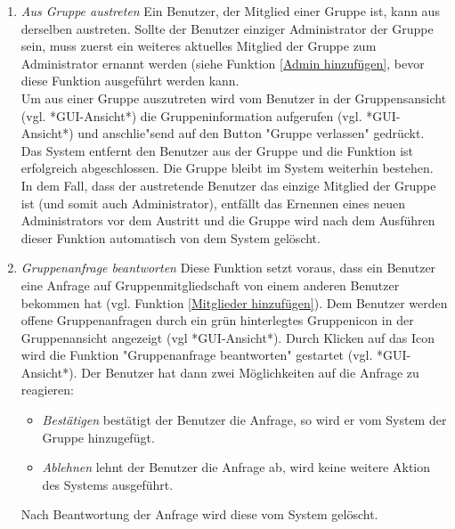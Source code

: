 \documentclass[parskip=full]{scrartcl}
\def\threedigits#1{%
  \ifnum#1<100 0\fi
  \ifnum#1<10 0\fi
  \number#1}
\begin{document}
\begin{enumerate}[label={\textbf{/F\protect\threedigits{\theenumi}0/}}, leftmargin=*, resume]
	\item \textit{Aus Gruppe austreten}
	Ein \gls{Benutzer}, der Mitglied einer Gruppe ist, kann aus derselben austreten. Sollte der Benutzer einziger Administrator der Gruppe sein, muss zuerst ein weiteres aktuelles Mitglied der Gruppe zum Administrator ernannt werden (siehe Funktion \ref{Admin hinzufügen}, bevor diese Funktion ausgeführt werden kann. \\
	Um aus einer Gruppe auszutreten wird vom Benutzer in der Gruppensansicht (vgl. *GUI-Ansicht*) die Gruppeninformation aufgerufen (vgl. *GUI-Ansicht*) und anschlie"send auf den Button "Gruppe verlassen" gedrückt. Das System entfernt den Benutzer aus der Gruppe und die Funktion ist erfolgreich abgeschlossen. Die Gruppe bleibt im System weiterhin bestehen.\\
	In dem Fall, dass der austretende Benutzer das einzige Mitglied der Gruppe ist (und somit auch Administrator), entfällt das Ernennen eines neuen Administrators vor dem Austritt und die Gruppe wird nach dem Ausführen dieser Funktion automatisch von dem System gelöscht.
	
	\item \textit{Gruppenanfrage beantworten} \label{Gruppenanfrage beantworten}
	Diese Funktion setzt voraus, dass ein Benutzer eine Anfrage auf Gruppenmitgliedschaft von einem anderen Benutzer bekommen hat (vgl. Funktion \ref{Mitglieder hinzufügen}). Dem Benutzer werden offene Gruppenanfragen durch ein grün hinterlegtes Gruppenicon in der Gruppenansicht angezeigt (vgl *GUI-Ansicht*). Durch Klicken auf das Icon wird die Funktion "Gruppenanfrage beantworten" gestartet (vgl. *GUI-Ansicht*). Der Benutzer hat dann zwei Möglichkeiten auf die Anfrage zu reagieren:
	\begin{itemize}
		\item \textit{Bestätigen} bestätigt der Benutzer die Anfrage, so wird er vom System der Gruppe hinzugefügt.
		\item \textit{Ablehnen} lehnt der Benutzer die Anfrage ab, wird keine weitere Aktion des Systems ausgeführt.
	\end{itemize}
Nach Beantwortung der Anfrage wird diese vom System gelöscht.
\end{enumerate}
\end{document}

